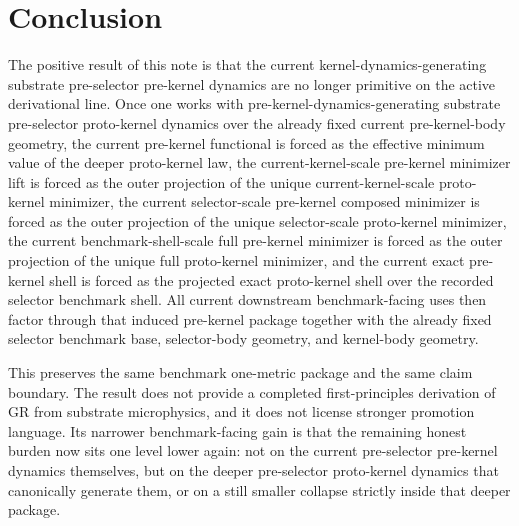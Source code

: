 \documentclass[11pt]{article}
\begin{document}
\section{Conclusion}

The positive result of this note is that the current kernel-dynamics-generating substrate pre-selector pre-kernel dynamics are no longer primitive on the active derivational line. Once one works with pre-kernel-dynamics-generating substrate pre-selector proto-kernel dynamics over the already fixed current pre-kernel-body geometry, the current pre-kernel functional is forced as the effective minimum value of the deeper proto-kernel law, the current-kernel-scale pre-kernel minimizer lift is forced as the outer projection of the unique current-kernel-scale proto-kernel minimizer, the current selector-scale pre-kernel composed minimizer is forced as the outer projection of the unique selector-scale proto-kernel minimizer, the current benchmark-shell-scale full pre-kernel minimizer is forced as the outer projection of the unique full proto-kernel minimizer, and the current exact pre-kernel shell is forced as the projected exact proto-kernel shell over the recorded selector benchmark shell. All current downstream benchmark-facing uses then factor through that induced pre-kernel package together with the already fixed selector benchmark base, selector-body geometry, and kernel-body geometry.

This preserves the same benchmark one-metric package and the same claim boundary. The result does not provide a completed first-principles derivation of GR from substrate microphysics, and it does not license stronger promotion language. Its narrower benchmark-facing gain is that the remaining honest burden now sits one level lower again: not on the current pre-selector pre-kernel dynamics themselves, but on the deeper pre-selector proto-kernel dynamics that canonically generate them, or on a still smaller collapse strictly inside that deeper package.
\end{document}
